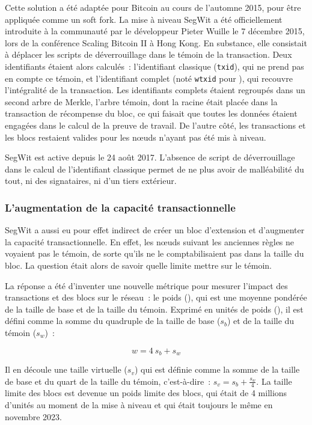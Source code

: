 Cette solution a été adaptée pour Bitcoin au cours de l'automne 2015, pour être appliquée comme un soft fork. La mise à niveau SegWit a été officiellement introduite à la communauté par le développeur Pieter Wuille le 7 décembre 2015, lors de la conférence Scaling Bitcoin \textsc{II} à Hong Kong. En substance, elle consistait à déplacer les scripts de déverrouillage dans le témoin de la transaction. Deux identifiants étaient alors calculés~: l'identifiant classique (\texttt{txid}), qui ne prend pas en compte ce témoin, et l'identifiant complet (noté \texttt{wtxid} pour ), qui recouvre l'intégralité de la transaction. Les identifiants complets étaient regroupés dans un second arbre de Merkle, l'arbre témoin, dont la racine était placée dans la transaction de récompense du bloc, ce qui faisait que toutes les données étaient engagées dans le calcul de la preuve de travail. De l'autre côté, les transactions et les blocs restaient valides pour les nœuds n'ayant pas été mis à niveau.

SegWit est active depuis le 24 août 2017. L'absence de script de déverrouillage dans le calcul de l'identifiant classique permet de ne plus avoir de malléabilité du tout, ni des signataires, ni d'un tiers extérieur.

\subsubsection*{L'augmentation de la capacité transactionnelle} SegWit a aussi eu pour effet indirect de créer un bloc d'extension et d'augmenter la capacité transactionnelle. En effet, les nœuds suivant les anciennes règles ne voyaient pas le témoin, de sorte qu'ils ne le comptabilisaient pas dans la taille du bloc. La question était alors de savoir quelle limite mettre sur le témoin.

La réponse a été d'inventer une nouvelle métrique pour mesurer l'impact des transactions et des blocs sur le réseau~: le poids (), qui est une moyenne pondérée de la taille de base et de la taille du témoin. Exprimé en unités de poids (), il est défini comme la somme du quadruple de la taille de base ($s_b$) et de la taille du témoin ($s_w$)~:

{ \small
\[
w = 4 ~ s_b + s_w
\]
}

Il en découle une taille virtuelle ($s_v$) qui est définie comme la somme de la taille de base et du quart de la taille du témoin, c'est-à-dire~: $s_v = s_b + \frac{s_w}{4}$. La taille limite des blocs est devenue un poids limite des blocs, qui était de 4 millions d'unités au moment de la mise à niveau et qui était toujours le même en novembre 2023.

